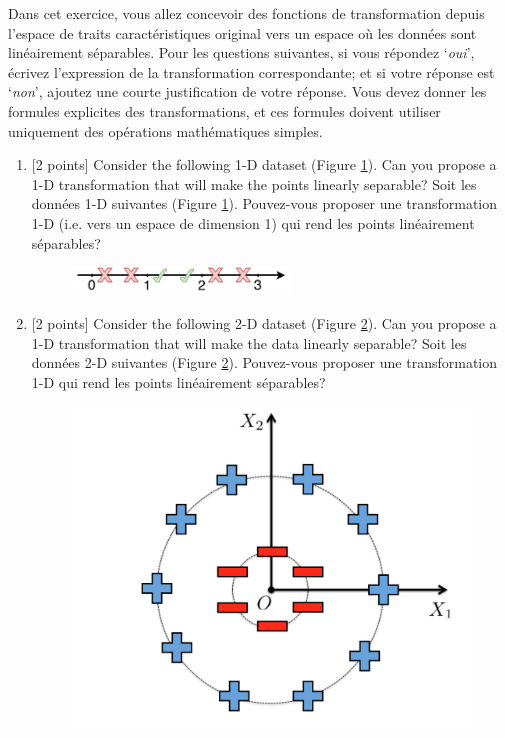 \documentclass[11pt,french,english]{article}
\newcommand{\french}[1]{ {\color{blue} #1} }
\begin{document}
\begin{enumerate}
{\french{Dans cet exercice, vous allez concevoir des fonctions de transformation depuis l'espace de traits caractéristiques original vers un espace où les données sont linéairement séparables. Pour les questions suivantes, si vous répondez `\textit{oui}', écrivez l'expression de la transformation correspondante; et si votre réponse est `\textit{non}', ajoutez une courte justification de votre réponse. Vous devez donner les formules explicites des transformations, et ces formules doivent utiliser uniquement des opérations mathématiques simples.
}


\begin{enumerate}
    \item { [2 points] Consider the following 1-D dataset (Figure \ref{a}). Can you propose a 1-D transformation that will make the points linearly separable? \french{ Soit les données 1-D suivantes (Figure \ref{a}). Pouvez-vous proposer une transformation 1-D (i.e. vers un espace de dimension 1) qui rend les points linéairement séparables?}

    \begin{figure}[!h]
    \centering
    \includegraphics[width=0.55\textwidth]{homework2/img/feat_map.pdf}
    \caption{}
    \label{a}
    \end{figure}}
%

    \item { [2 points] Consider the following 2-D dataset (Figure \ref{b}). Can you propose a 1-D transformation that will make the data linearly separable? \french{Soit les données 2-D suivantes (Figure \ref{b}). Pouvez-vous proposer une transformation 1-D qui rend les points linéairement séparables?}
    \begin{figure}[h]
    \centerline{\includegraphics[scale=0.4]{homework2/img/D5.png}}
    \caption{}
    \label{b}
    \end{figure}}


\end{enumerate}}
\end{enumerate}
\end{document}
